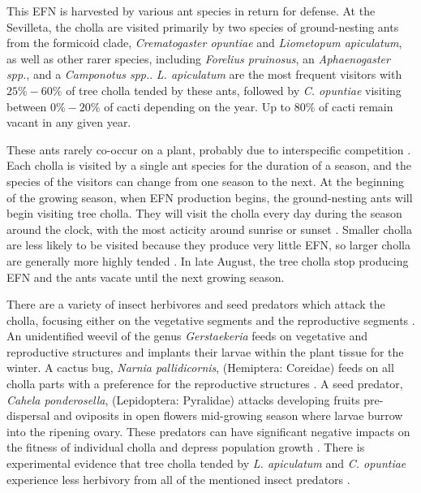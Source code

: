 \documentclass[11pt]{article}\usepackage[sc]{mathpazo} %
\begin{document}
  This EFN is harvested by various ant species in return for defense. 
At the Sevilleta, the cholla are visited primarily by two species of ground-nesting ants from the formicoid clade, \textit{Crematogaster opuntiae} and \textit{Liometopum apiculatum}, as well as other rarer species, including \textit{Forelius pruinosus}, an \textit{Aphaenogaster spp.}, and a \textit{Camponotus spp.}.
\textit{L. apiculatum} are the most frequent visitors with $25\% - 60\%$ of tree cholla tended by these ants, followed by \textit{C. opuntiae} visiting between $0\% - 20\%$ of cacti \cite{Donald2022} depending on the year. Up to $80\%$ of cacti remain vacant in any given year. 

  These ants rarely co-occur on a plant, probably due to interspecific competition \cite{Miller2007}.
Each cholla is visited by a single ant species for the duration of a season, and the species of the visitors can change from one season to the next. 
At the beginning of the growing season, when EFN production begins, the ground-nesting ants will begin visiting tree cholla.
They will visit the cholla every day during the season around the clock, with the most acticity around sunrise or sunset \cite{Ohm2014}. 
Smaller cholla are less likely to be visited because they produce very little EFN, so larger cholla are generally more highly tended \cite{Miller2014}. 
In late August, the tree cholla stop producing EFN and the ants vacate until the next growing season. 

  There are a variety of insect herbivores and seed predators which attack the cholla, focusing either on the vegetative segments and the reproductive segments \cite{Mann1969}. 
An unidentified weevil of the genus \textit{Gerstaekeria} feeds on vegetative and reproductive structures and implants their larvae within the plant tissue for the winter. 
A cactus bug, \textit{Narnia pallidicornis}, (Hemiptera: Coreidae) feeds on all cholla parts with a preference for the reproductive structures \cite{Miller2006}.
A seed predator, \textit{Cahela ponderosella}, (Lepidoptera: Pyralidae) attacks developing fruits pre-dispersal and oviposits in open flowers mid-growing season where larvae burrow into the ripening ovary. 
These predators can have significant negative impacts on the fitness of individual cholla and depress population growth \cite{Miller2009}.
There is experimental evidence that tree cholla tended by \textit{L. apiculatum} and \textit{C. opuntiae} experience less herbivory from all of the mentioned insect predators \cite{Miller2007}. 
\end{document}
